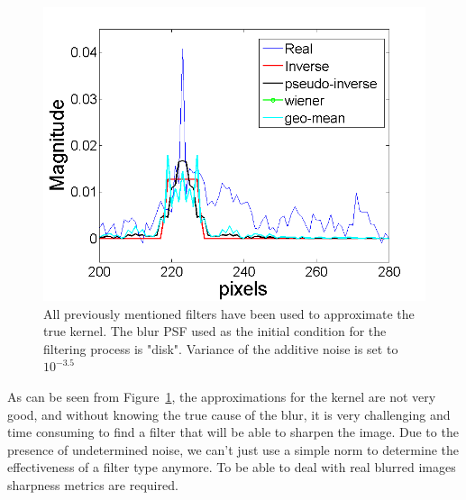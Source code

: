 \begin{figure}[H]

  \centering
                \centering
                \includegraphics[width=.4\textwidth]{true_kernel.png}
                \caption{All previously mentioned filters have been used to approximate the true kernel. The blur PSF used as the initial condition for the filtering process is "disk". Variance of the additive noise is set to $10^{-3.5}$ }
                \label{fig:true_kernel}
\end{figure}

As can be seen from Figure~\ref{fig:true_kernel}, the approximations for the kernel are not very good, and without knowing the true cause of the blur, it is very challenging and time consuming to find a filter that will be able to sharpen the image. Due to the presence of undetermined noise, we can't just use a simple norm to determine the effectiveness of a filter type anymore. To be able to deal with real blurred images sharpness metrics are required.
\newpage